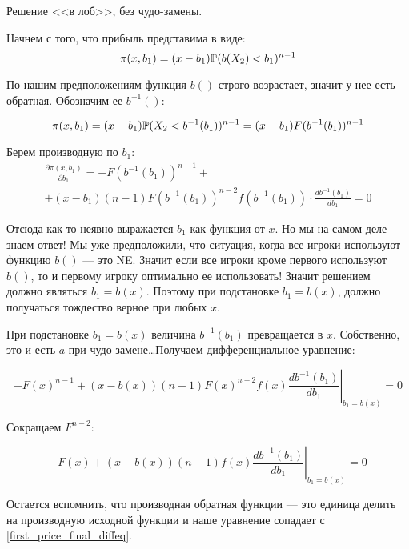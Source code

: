 \begin{enumerate}
\begin{myex} Решение <<в лоб>>, без чудо-замены.

Начнем с того, что прибыль представима в виде:
\begin{equation}
\pi(x,b_{1})=(x-b_{1})\P(b(X_{2})<b_{1})^{n-1}
\end{equation}

По нашим предположениям функция $ b() $ строго возрастает, значит у нее есть обратная. Обозначим ее $ b^{-1}() $:

\begin{equation}
\pi(x,b_{1})=(x-b_{1})\P(X_{2}<b^{-1}(b_{1}))^{n-1}=(x-b_{1})F(b^{-1}(b_{1}))^{n-1}
\end{equation}

Берем производную по $ b_{1} $:
\begin{multline}
\frac{\partial \pi(x,b_{1})}{\partial b_{1}}=-F(b^{-1}(b_{1}))^{n-1}+\\
+(x-b_{1})(n-1)F(b^{-1}(b_{1}))^{n-2}f(b^{-1}(b_{1}))\cdot \frac{db^{-1}(b_{1})}{db_{1}}=0
\end{multline}

Отсюда как-то неявно выражается $ b_{1} $ как функция от $ x $. Но мы на самом деле знаем ответ! Мы уже предположили, что ситуация, когда все игроки используют функцию $ b() $ --- это NE. Значит если все игроки кроме первого используют $ b() $, то и первому игроку оптимально ее использовать! Значит решением должно являться $ b_{1}=b(x) $. Поэтому при подстановке $ b_{1}=b(x) $, должно получаться тождество верное при любых $ x $.

При подстановке $ b_{1}=b(x) $ величина $ b^{-1}(b_{1}) $ превращается в $ x $. Собственно, это и есть $ a $ при чудо-замене\ldots Получаем дифференциальное уравнение:

\begin{equation}
-F(x)^{n-1}+(x-b(x))(n-1)F(x)^{n-2}f(x)\left.\frac{db^{-1}(b_{1})}{db_{1}}\right|_{b_{1}=b(x)}=0
\end{equation}

Сокращаем $ F^{n-2} $:

\begin{equation}
-F(x)+(x-b(x))(n-1)f(x)\left.\frac{db^{-1}(b_{1})}{db_{1}}\right|_{b_{1}=b(x)}=0
\end{equation}

Остается вспомнить, что производная обратная функции --- это единица делить на производную исходной функции и наше уравнение сопадает с \ref{first_price_final_diffeq}.
\end{myex}


\end{enumerate}

